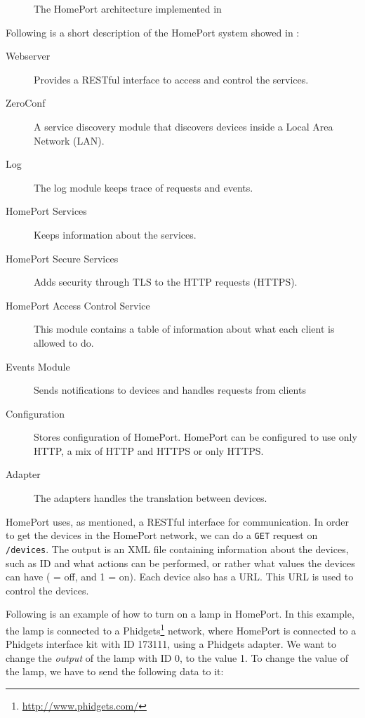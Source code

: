 \begin{figure}[!htb]
    \centering
    
    \caption{The HomePort architecture implemented in \protect\cite{HOMEPORT13}}
    \label{fig:homeport2}
\end{figure}

Following is a short description of the HomePort system showed in :
\begin{description}
    \item[Webserver] Provides a RESTful interface to access and control the services.
    \item[ZeroConf] A service discovery module that discovers devices inside a Local Area Network (LAN).
    \item[Log] The log module keeps trace of requests and events. 
    \item[HomePort Services] Keeps information about the services. 
    \item[HomePort Secure Services] Adds security through TLS to the HTTP requests (HTTPS).
    \item[HomePort Access Control Service] This module contains a table of information about what each client is allowed to do. 
    \item[Events Module] Sends notifications to devices and handles requests from clients
    \item[Configuration] Stores configuration of HomePort. HomePort can be configured to use only HTTP, a mix of HTTP and HTTPS or only HTTPS.
    \item[Adapter] The adapters handles the translation between devices. 
\end{description}

HomePort uses, as mentioned, a RESTful interface for communication. 
In order to get the devices in the HomePort network, 
we can do a \texttt{GET} request on \texttt{/devices}.
The output is an XML file containing information about the devices,
such as ID and what actions can be performed,
or rather what values the devices can have ( = off, and 1 = on).
Each device also has a URL. 
This URL is used to control the devices. 

Following is an example of how to turn on a lamp in HomePort.
In this example, the lamp is connected to a Phidgets\footnote{\url{http://www.phidgets.com/}} network, 
where HomePort is connected to a Phidgets interface kit with ID 173111, 
using a Phidgets adapter. 
We want to change the \emph{output} of the lamp with ID 0, 
to the value 1. 
To change the value of the lamp, 
we have to send the following data to it:

